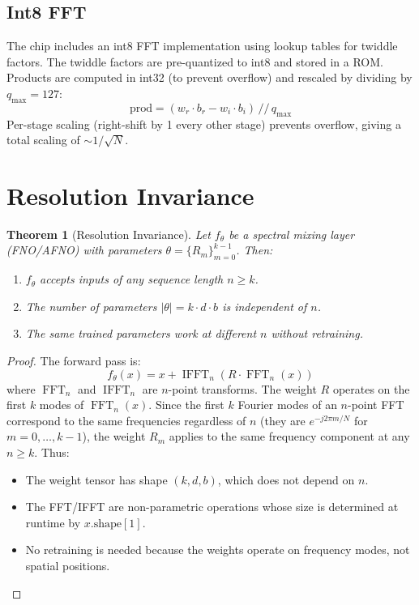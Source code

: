 \documentclass[11pt,a4paper]{article}
\newtheorem{theorem}{Theorem}
\theoremstyle{definition}
\theoremstyle{remark}
\newcommand{\abs}[1]{\left\lvert#1\right\rvert}
\newcommand{\FFT}{\operatorname{FFT}}
\newcommand{\IFFT}{\operatorname{IFFT}}
\begin{document}
\subsection{Int8 FFT}

The chip includes an int8 FFT implementation using lookup tables for twiddle
factors. The twiddle factors are pre-quantized to int8 and stored in a ROM.
Products are computed in int32 (to prevent overflow) and rescaled by dividing
by $q_{\max} = 127$:
\begin{equation}
  \text{prod} = (w_r \cdot b_r - w_i \cdot b_i) \, // \, q_{\max}
\end{equation}
Per-stage scaling (right-shift by 1 every other stage) prevents overflow,
giving a total scaling of $\sim 1/\sqrt{N}$.

\section{Resolution Invariance}

\begin{theorem}[Resolution Invariance]
\label{thm:resinv}
Let $f_\theta$ be a spectral mixing layer (FNO/AFNO) with parameters
$\theta = \{R_m\}_{m=0}^{k-1}$. Then:
\begin{enumerate}[noitemsep]
  \item $f_\theta$ accepts inputs of any sequence length $n \geq k$.
  \item The number of parameters $\abs{\theta} = k \cdot d \cdot b$ is
    independent of $n$.
  \item The same trained parameters work at different $n$ without
    retraining.
\end{enumerate}
\end{theorem}

\begin{proof}
The forward pass is:
\begin{equation}
  f_\theta(x) = x + \IFFT_n\!\left( R \cdot \FFT_n(x) \right)
\end{equation}
where $\FFT_n$ and $\IFFT_n$ are $n$-point transforms. The weight $R$ operates
on the first $k$ modes of $\FFT_n(x)$. Since the first $k$ Fourier modes of an
$n$-point FFT correspond to the same frequencies regardless of $n$ (they are
$e^{-j2\pi m / N}$ for $m = 0, \ldots, k-1$), the weight $R_m$ applies to the same
frequency component at any $n \geq k$. Thus:
\begin{itemize}[noitemsep]
  \item The weight tensor has shape $(k, d, b)$, which does not depend on $n$.
  \item The FFT/IFFT are non-parametric operations whose size is determined at
    runtime by $x.\text{shape}[1]$.
  \item No retraining is needed because the weights operate on frequency modes,
    not spatial positions.
\end{itemize}
\end{proof}
\end{document}
